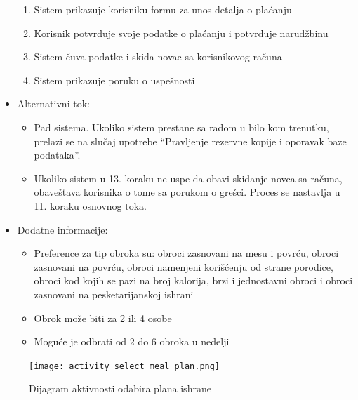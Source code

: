 \begin{itemize}
\begin{enumerate}
            \item Sistem prikazuje korisniku formu za unos detalja o plaćanju
            \item Korisnik potvrđuje svoje podatke o plaćanju i potvrđuje narudžbinu
            \item Sistem čuva podatke i skida novac sa korisnikovog računa
            \item Sistem prikazuje poruku o uspešnosti 
        \end{enumerate}
    \item Alternativni tok:
        \begin{itemize}
            \item Pad sistema. Ukoliko sistem prestane sa radom u bilo kom trenutku, prelazi se na slučaj upotrebe ``Pravljenje rezervne kopije i oporavak baze podataka''.
            \item Ukoliko sistem u 13. koraku ne uspe da obavi skidanje novca sa računa, obaveštava korisnika o tome sa porukom o grešci. Proces se nastavlja u 11. koraku osnovnog toka.
        \end{itemize}
    \item Dodatne informacije:
        \begin{itemize}
            \item Preference za tip obroka su: obroci zasnovani na mesu i povrću, obroci zasnovani na povrću, obroci namenjeni korišćenju od strane porodice, obroci kod kojih se pazi na broj kalorija, brzi i jednostavni obroci i obroci zasnovani na pesketarijanskoj ishrani 
            \item Obrok može biti za 2 ili 4 osobe
            \item Moguće je odbrati od 2 do 6 obroka u nedelji
        \end{itemize}
\end{itemize}

\begin{figure}[H]
\begin{center}
\texttt{[image: activity\_select\_meal\_plan.png]}
\end{center}
    \caption{Dijagram aktivnosti odabira plana ishrane}
\label{fig:ActivitySelectMealPlan}
\end{figure}
